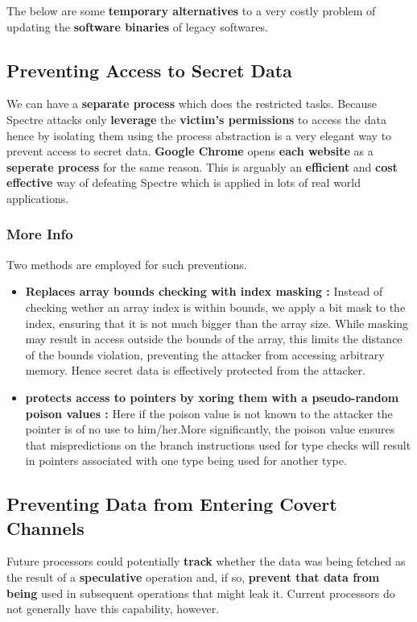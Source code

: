 \documentclass[12pt]{article}
\begin{document}
The below are some \textbf{temporary alternatives} to a very costly problem of updating the \textbf{software binaries} of legacy softwares.
\subsection{Preventing Access to Secret Data}
We can have a \textbf{separate process} which does the restricted tasks. Because Spectre attacks only \textbf{leverage} the \textbf{victim’s permissions} to access the data hence by isolating them using the process abstraction is a very elegant way to prevent access to secret data. \textbf{Google Chrome} opens \textbf{each website} as a \textbf{seperate process} for the same reason. This is arguably an \textbf{efficient} and \textbf{cost effective} way of defeating Spectre which is applied in lots of real world applications.
\subsubsection{More Info}
Two methods are employed for such preventions.
\begin{itemize}
	\item \textbf{Replaces array bounds checking with index masking	:} Instead of checking wether an array index is within bounds, we apply a bit mask to the index, ensuring that it is not much bigger than the array size. While masking may result in access outside the bounds of the array, this limits the distance of the bounds violation, preventing the attacker from accessing arbitrary memory. Hence secret data is effectively protected from the attacker.
	\item \textbf{protects access to pointers by xoring them with a pseudo-random poison values	:} Here if the poison value is not known to the attacker the pointer is of no use to him/her.More significantly, the poison value ensures that mispredictions on the branch instructions used for type checks will result in pointers associated with one type being used for another type.
\end{itemize}
\subsection{Preventing Data from Entering Covert Channels}
Future processors could potentially \textbf{track} whether the data was being
fetched as the result of a \textbf{speculative} operation and, if so,
\textbf{prevent that data from being} used in subsequent operations
that might leak it. Current processors do not generally have
this capability, however.
\end{document}
